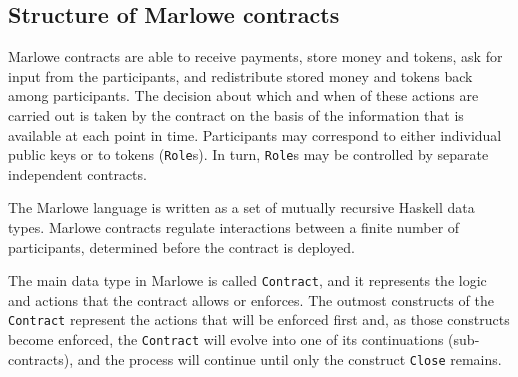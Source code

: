 \documentclass[english,runningheads]{llncs}
\begin{document}
\subsection{Structure of Marlowe contracts\label{subsec:Structure-of-Marlowe} }

Marlowe contracts are able to receive payments, store money and tokens,
ask for input from the participants, and redistribute stored money
and tokens back among participants. The decision about which and when of
these actions are carried out is taken by the contract on the basis
of the information that is available at each point in time. Participants
may correspond to either individual public keys or to tokens (\texttt{Role}s).
In turn, \texttt{Role}s may be controlled by separate independent contracts.

The Marlowe language is written as a set of mutually recursive Haskell
data types. Marlowe contracts regulate interactions between a finite number
of participants, determined before the contract is deployed.

The main data type in Marlowe is called \texttt{Contract}, and it represents
the logic and actions that the contract allows or enforces. The outmost
constructs of the \texttt{Contract} represent the actions that will be enforced
first and, as those constructs become enforced, the \texttt{Contract} will
evolve into one of its continuations (sub-contracts), and the process
will continue until only the construct \texttt{Close} remains.
\end{document}
